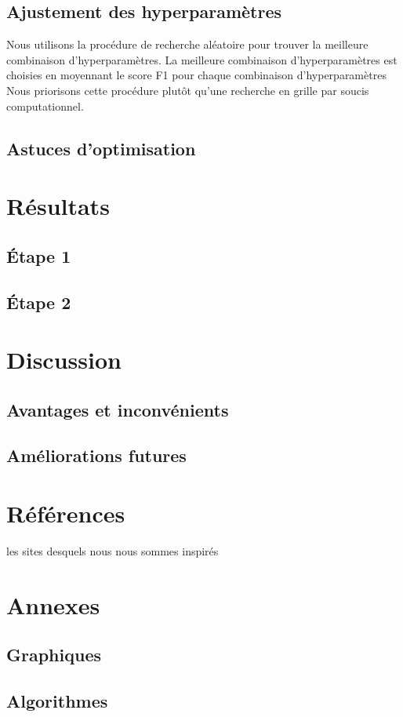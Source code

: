 \documentclass{article}
\begin{document}
\subsection{Ajustement des hyperparamètres}
Nous utilisons la procédure de recherche aléatoire pour trouver la meilleure combinaison d'hyperparamètres. La meilleure combinaison d'hyperparamètres est choisies en moyennant le score F1 pour chaque combinaison d'hyperparamètres Nous priorisons cette procédure plutôt qu'une recherche en grille par soucis computationnel. 
\subsection{Astuces d'optimisation}

\section{Résultats}
\subsection{Étape 1}
\subsection{Étape 2}

\section{Discussion}
\subsection{Avantages et inconvénients}
\subsection{Améliorations futures}

\section{Références}
les sites desquels nous nous sommes inspirés

\section{Annexes}
\subsection{Graphiques}
\subsection{Algorithmes}
\end{document}
